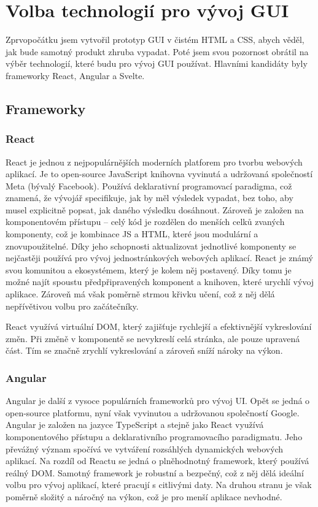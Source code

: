 \section{Volba technologií pro vývoj GUI}
Zprvopočátku jsem vytvořil prototyp GUI v čistém HTML a CSS, abych věděl, jak bude samotný produkt zhruba vypadat. Poté jsem svou pozornost obrátil na výběr technologií, které budu pro vývoj GUI používat. Hlavními kandidáty byly frameworky React, Angular a Svelte.

\subsection{Frameworky}

\subsubsection{React}
React je jednou z nejpopulárnějších moderních platforem pro tvorbu webových aplikací. Je to open-source JavaScript knihovna vyvinutá a udržovaná společností Meta (bývalý Facebook). Používá deklarativní programovací paradigma, což znamená, že vývojář specifikuje, jak by měl výsledek vypadat, bez toho, aby musel explicitně popsat, jak daného výsledku dosáhnout. Zároveň je založen na komponentovém přístupu -- celý kód je rozdělen do menších celků zvaných komponenty, což je kombinace JS a HTML, které jsou modulární a znovupoužitelné. Díky jeho schopnosti aktualizovat jednotlivé komponenty se nejčastěji používá pro vývoj jednostránkových webových aplikací. React je známý svou komunitou a ekosystémem, který je kolem něj postavený. Díky tomu je možné najít spoustu předpřipravených komponent a knihoven, které urychlí vývoj aplikace. Zároveň má však poměrně strmou křivku učení, což z něj dělá nepřívětivou volbu pro začátečníky.

React využívá virtuální DOM, který zajišťuje rychlejší a efektivnější vykreslování změn. Při změně v komponentě se nevykreslí celá stránka, ale pouze upravená část. Tím se značně zrychlí vykreslování a zároveň sníží nároky na výkon.\cite{react, what_react_is_and_why_it_matters, angular_vs_react}

\subsubsection{Angular}
Angular je další z vysoce populárních frameworků pro vývoj UI. Opět se jedná o open-source platformu, nyní však vyvinutou a udržovanou společností Google. Angular je založen na jazyce TypeScript a stejně jako React využívá komponentového přístupu a deklarativního programovacího paradigmatu. Jeho převážný význam spočívá ve vytváření rozsáhlých dynamických webových aplikací. Na rozdíl od Reactu se jedná o plněhodnotný framework, který používá reálný DOM. Samotný framework je robustní a bezpečný, což z něj dělá ideální volbu pro vývoj aplikací, které pracují s citlivými daty. Na druhou stranu je však poměrně složitý a náročný na výkon, což je pro menší aplikace nevhodné.\cite{what_is_angular, angular_vs_react}

